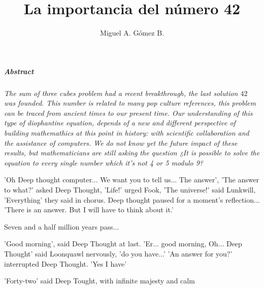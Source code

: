 \documentclass{article}
\title{La importancia del número 42}
\author{Miguel A. Gómez B.}
\begin{document}
	\maketitle

\subparagraph{Abstract}\textit{The sum of three cubes problem had a recent breakthrough, the last solution $42$ was founded. This number is related to many pop culture references, this problem can be traced from ancient times to our present time. Our understanding of this type of diophantine equation, depends of a new and different perspective of building mathemathics at this point in history: with scientific collaboration and the assistance of computers. We do not know yet the future impact of these results, but mathematicians are still asking the question ¿It is possible to solve the equation to every single number which it's not 4 or 5 modulo 9?}
\begin{flushleft}
	'Oh Deep thought computer... We want you to tell us... The answer', 'The answer to what?' asked Deep Thought, 'Life!' urged Fook, 'The universe!' said Lunkwill, 'Everything' they said in chorus.
	Deep thought paused for a moment's reflection... 'There is an answer. But I will have to think about it.'
	\begin{center}
		Seven and a half million years pass...
	\end{center}
	'Good morning', said Deep Thought at last. 'Er... good morning, Oh... Deep Thought' said Loonquawl nervously, 'do you have...' 'An answer for you?' interrupted Deep Thought. 'Yes I have'
	\begin{center}
		'Forty-two' said Deep Tought, with infinite majesty and calm
	\end{center}
\end{flushleft}
\end{document}
